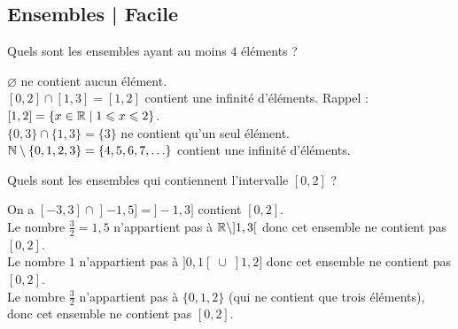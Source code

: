 \subsection{Ensembles | Facile}

\begin{question}
Quels sont les ensembles ayant au moins $4$ éléments ?
\begin{answers} 
	\bad{$\varnothing$}
	\good{$[0,2] \cap [1,3]$}
\end{answers}
\begin{explanations}
$\varnothing$ ne contient aucun élément. \\
$[0,2] \cap [1,3] = [1,2]$ contient une infinité d'éléments. Rappel : $[1,2] = \{x\in\mathbb{R} \mid 1 \leqslant x \leqslant 2\}$.\\
$\{0,3\} \cap \{1,3\} = \{3\}$ ne contient qu'un seul élément. \\
$\mathbb{N} \setminus \{0,1,2,3\} = \{4,5,6,7,\ldots\}$ contient une infinité d'éléments. 
\end{explanations}
\end{question}


\begin{question}
Quels sont les ensembles qui contiennent l'intervalle $[0,2]$ ?
\begin{answers} 
	\good{$[-3,3] \cap \mathopen]-1,5]$}
	\bad{$\Rr \setminus ]1,3[$}
	\bad{$]0,1[ \; \cup \; ]1,2]$}
\end{answers}
\begin{explanations}
On a $[-3,3] \cap  \mathopen]-1,5] = ]-1,3]$ contient $[0,2]$. \\
Le nombre $\frac32 = 1,5$ n'appartient pas à $\Rr \setminus ]1,3[$ donc cet ensemble ne contient pas $[0,2]$. \\
Le nombre $1$ n'appartient pas à $]0,1[ \; \cup \; ]1,2]$  donc cet ensemble ne contient pas $[0,2]$. \\
Le nombre $\frac32$  n'appartient pas à $\{0,1,2\}$ (qui ne contient que trois éléments), donc cet ensemble ne contient pas $[0,2]$. \\ 
\end{explanations}
\end{question}


